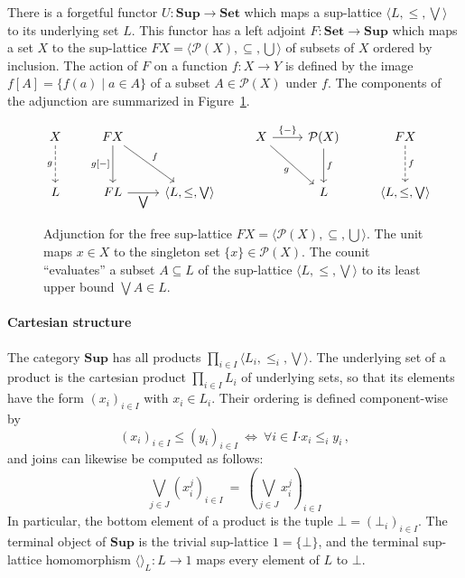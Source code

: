 \documentclass[11pt,oneside]{book}
\theoremstyle{definition}
\newcommand{\bdot}{\boldsymbol{\cdot}}
\begin{document}
There is a forgetful functor
$U : \mathbf{Sup} \rightarrow \mathbf{Set}$
which maps a sup-lattice $\langle L, {\le}, {\bigvee} \rangle$
to its underlying set $L$.
This functor has a left adjoint
$F : \mathbf{Set} \rightarrow \mathbf{Sup}$
which maps a set $X$ to the sup-lattice
$F X = \langle \mathcal{P}(X), {\subseteq}, {\bigcup} \rangle$
of subsets of $X$ ordered by inclusion.
The action of $F$ on a function $f : X \rightarrow Y$
is defined by the image $f[A] = \{ f(a) \mid a \in A \}$
of a subset $A \in \mathcal{P}(X)$ under $f$.
The components of the adjunction are summarized
in Figure~\ref{fig:pow}.


\begin{figure} %
  \[
    \begin{tikzcd}[row sep=large]
      X \ar[d, "g"', dashed] &
      F X \ar[d, "{g[-]}"'] \ar[dr, "f"] &
      &
      X \ar[r, "\{ - \}"] \ar[dr, "g"'] &
      \mathcal{P}(X) \ar[d, "f"] &
      F X \ar[d, "f", dashed]
      \\
      L &
      F L \ar[r, "{\bigvee}"'] &
      \langle L, {\le}, {\bigvee} \rangle &
      &
      L &
      \langle L, {\le}, {\bigvee} \rangle
    \end{tikzcd}
  \]
  \caption[Adjunction for the free sup-lattice]%
   {Adjunction for the free sup-lattice
    $F X = \langle \mathcal{P}(X), {\subseteq}, {\bigcup} \rangle$.
    The unit maps $x \in X$
    to the singleton set $\{ x \} \in \mathcal{P}(X)$.
    The counit ``evaluates'' a subset $A \subseteq L$
    of the sup-lattice $\langle L, {\le}, {\bigvee} \rangle$
    to its least upper bound $\bigvee A \in L$.}
  \label{fig:pow}
\end{figure}

\paragraph{Cartesian structure} %

The category $\mathbf{Sup}$ has all products
$\prod_{i \in I} \langle L_i, {\le_i}, \bigvee \rangle$.
The underlying set of a product
is the cartesian product $\prod_{i \in I} L_i$
of underlying sets,
so that its elements have the form $(x_i)_{i \in I}$
with $x_i \in L_i$.
Their ordering is defined component-wise by
\[
  (x_i)_{i \in I} \le (y_i)_{i \in I}
  \: \Leftrightarrow \:
  \forall i \in I \bdot x_i \le_i y_i
  \,,
\]
and joins can likewise be computed as follows:
\[
  \bigvee_{j \in J} (x_i^j)_{i \in I}
  \: = \:
  \left( \bigvee_{j \in J} x_i^j \right)_{i \in I}
\]
In particular,
the bottom element of a product
is the tuple $\bot = (\bot_i)_{i \in I}$.
The terminal object
of $\mathbf{Sup}$ is the trivial sup-lattice $1 = \{ \bot \}$,
and the terminal sup-lattice homomorphism
$\langle \rangle_L : L \rightarrow 1$
maps every element of $L$ to $\bot$.
\end{document}
